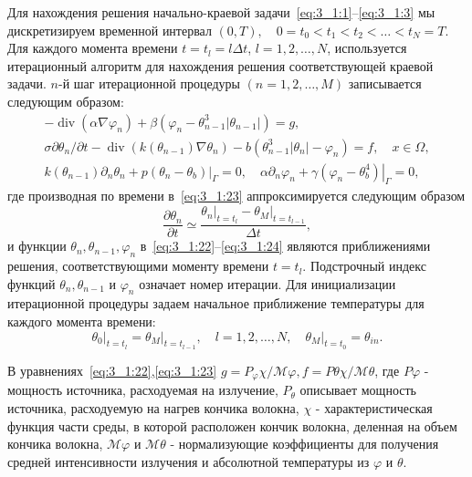 Для нахождения решения начально-краевой
задачи~\eqref{eq:3_1:1}--\eqref{eq:3_1:3}
мы дискретизируем временной интервал
$(0, T), \quad 0=t_{0}<t_{1}<t_{2}<\ldots<t_{N}=T$.
Для каждого момента времени $t=t_{l}=l \Delta t$, $l=1,2, \ldots, N$,
используется итерационный алгоритм для нахождения решения соответствующей
краевой задачи. $n$-й шаг итерационной процедуры $(n=1,2, \ldots, M)$
записывается следующим образом:
\begin{gather}
    -\operatorname{div}\left(\alpha \nabla \varphi_{n}\right)
    +\beta\left(\varphi_{n}-\theta_{n-1}^{3}
    \left|\theta_{n-1}\right|\right)=g, \label{eq:3_1:22}\\
    \sigma \partial \theta_{n} / \partial t
    -\operatorname{div}\left(k\left(\theta_{n-1}\right)
    \nabla \theta_{n}\right)
    -b\left(\theta_{n-1}^{3}\left|\theta_{n}\right|
    -\varphi_{n}\right)=f, \quad x \in \Omega, \label{eq:3_1:23}\\
    k\left(\theta_{n-1}\right) \partial_{n} \theta_{n}
    +\left.p\left(\theta_{n}-\theta_{b}\right)\right|_{\Gamma}=0,
    \quad \alpha \partial_{n} \varphi_{n}+\left.\gamma
    \left(\varphi_{n}-\theta_{b}^{4}\right)\right|_{\Gamma}=0,\label{eq:3_1:24}
\end{gather}
где производная по времени в~\eqref{eq:3_1:23}
аппроксимируется следующим образом
\[
    \frac{\partial \theta_{n}}{\partial t} \simeq
    \frac{
        \left.\theta_{n}\right|_{t=t_{l}}
        -\left.\theta_{M}\right|_{t=t_{l-1}}
    }{\Delta t},
\]
и функции $\theta_{n}, \theta_{n-1}, \varphi_{n}$
в~\eqref{eq:3_1:22}--\eqref{eq:3_1:24} являются приближениями решения,
соответствующими моменту времени $t=t_{l}$.
Подстрочный индекс функций
$\theta_{n}, \theta_{n-1}$ и $\varphi_{n}$ означает номер итерации.
Для инициализации итерационной процедуры задаем начальное приближение
температуры для каждого момента времени:
\begin{equation}
    \label{eq:3_1:25}
    \left.\theta_{0}\right|_{t=t_{l}}=
    \left.\theta_{M}\right|_{t=t_{l-1}},
    \quad l=1,2, \ldots, N, \left.\quad
    \theta_{M}\right|_{t=t_{0}}=\theta_{i n}.
\end{equation}

В уравнениях~\eqref{eq:3_1:22},\eqref{eq:3_1:23}
$g=P_{\varphi} \chi / \mathcal{M}{\varphi},
f=P{\theta} \chi / \mathcal{M}{\theta}$,
где $P{\varphi}$ - мощность источника, расходуемая на излучение,
$P_{\theta}$ описывает мощность источника, расходуемую на нагрев
кончика волокна, $\chi$ - характеристическая функция части среды,
в которой расположен кончик волокна, деленная на объем кончика волокна,
$\mathcal{M}{\varphi}$ и $\mathcal{M}{\theta}$ - нормализующие коэффициенты
для получения средней интенсивности излучения
и абсолютной температуры из $\varphi$ и $\theta$.

